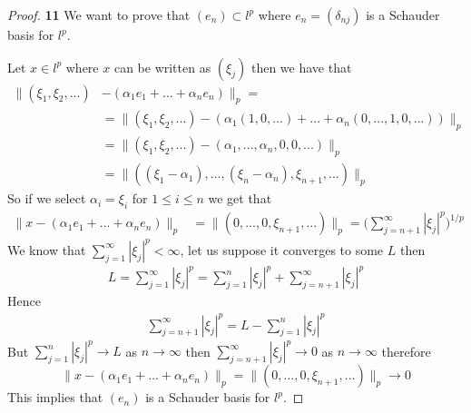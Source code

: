 \documentclass[11pt]{article}
\theoremstyle{definition}
\begin{document}
\begin{proof}{\textbf{11}}
    We want to prove that $(e_n) \subset l^p$ where
    $e_n = (\delta_{nj})$ is a Schauder basis for $l^p$.

    Let $x \in l^p$ where $x$ can be written as $(\xi_j)$ then we have that
    \begin{align*}
        \|(\xi_1, \xi_2, ...) &- (\alpha_1 e_1 + ... + \alpha_n e_n)\|_p = \\
        &= \|(\xi_1, \xi_2, ...) - (\alpha_1 (1,0,...) + ... + \alpha_n (0,...,1,0,...))\|_p\\
        &= \|(\xi_1, \xi_2, ...) - (\alpha_1, ..., \alpha_n, 0, 0, ...)\|_p\\
        &= \|((\xi_1 - \alpha_1),..., (\xi_n - \alpha_n), \xi_{n+1}, ...) \|_p
    \end{align*}
    So if we select $\alpha_i = \xi_i$ for $1 \leq i \leq n$ we get that
    \begin{align*}
        \|x - (\alpha_1 e_1 + ... + \alpha_n e_n)\|_p
        &= \|(0, ..., 0, \xi_{n+1}, ...) \|_p
        = \bigg(\sum_{j=n+1}^\infty |\xi_j|^p\bigg)^{1/p}
    \end{align*}
    We know that $\sum_{j=1}^\infty |\xi_j|^p < \infty$, let us suppose it converges to some
    $L$ then
    \begin{align*}
        L = \sum_{j=1}^\infty |\xi_j|^p =
        \sum_{j=1}^n |\xi_j|^p + \sum_{j=n+1}^\infty |\xi_j|^p
    \end{align*}
    Hence
    \begin{align*}
        \sum_{j=n+1}^\infty |\xi_j|^p = L - \sum_{j=1}^n |\xi_j|^p
    \end{align*}
    But $\sum_{j=1}^n |\xi_j|^p \to L$ as $n \to \infty$ then
    $\sum_{j=n+1}^\infty |\xi_j|^p \to 0$ as $n \to \infty$ therefore
    $$\|x - (\alpha_1 e_1 + ... + \alpha_n e_n)\|_p =
    \|(0, ..., 0, \xi_{n+1}, ...) \|_p \to 0$$
    This implies that $(e_n)$ is a Schauder basis for $l^p$.
\end{proof}
\cleardoublepage
\end{document}
